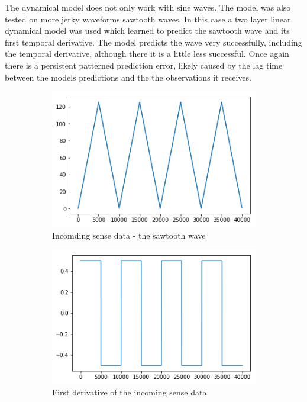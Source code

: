 The dynamical model does not only work with sine waves. The model was also tested on more jerky waveforms sawtooth waves. In this case a two layer linear dynamical model was used which learned to predict the sawtooth wave and its first temporal derivative. The model predicts the wave very successfully, including the temporal derivative, although there it is a little less successful. Once again there is a persistent patterned prediction error, likely caused by the lag time between the models predictions and the the observations it receives. 
\begin{figure}[H]
\centering
\begin{subfigure}{.32\linewidth}
 \centering
 \includegraphics[width=0.8\linewidth]{chapter_3_figures/sawtooth_phi.png}
 \caption{Incomding sense data - the sawtooth wave}
\end{subfigure}
 \hfill
\begin{subfigure}{.32\linewidth}
 \centering
 \includegraphics[width=0.8\linewidth]{chapter_3_figures/sawtooth_phidot.png}
 \caption{First derivative of the incoming sense data}
\end{subfigure}
\hfill
\begin{subfigure}{.32\linewidth}

\end{subfigure}
\end{figure}
